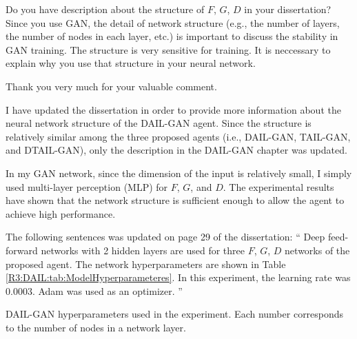 
\begin{revcomment}
  Do you have description about the structure of $F$, $G$, $D$ in your dissertation?
  Since you use GAN, the detail of network structure
  (e.g., the number of layers,
  the number of nodes in each layer, etc.)
  is important to discuss the stability in GAN training.
  The structure is very sensitive for training.
  It is neccessary to explain why you use that structure in your neural network.
\end{revcomment}

\begin{revresponse}
  Thank you very much for your valuable comment.

  I have updated the dissertation in order to provide more information about the neural network structure of the DAIL-GAN agent.
  Since the structure is relatively similar among the three proposed agents
  (i.e., DAIL-GAN, TAIL-GAN, and DTAIL-GAN),
  only the description in the DAIL-GAN chapter was updated.

  In my GAN network,
  since the dimension of the input is relatively small,
  I simply used multi-layer perception (MLP) for $F$, $G$, and $D$.
  The experimental results have shown that the network structure is sufficient enough to allow the agent to achieve high performance.

  \begin{correction}
    The following sentences was updated on page 29 of the dissertation:
    \enquote{%
      Deep feed-forward networks with 2 hidden layers are used for three $F$, $G$, $D$ networks of the proposed agent.
      The network hyperparameters are shown in Table \ref{R3:DAIL:tab:ModelHyperparameteres}.
      In this experiment, the learning rate was 0.0003.
      Adam was used as an optimizer.%
    }

    {DAIL-GAN hyperparameters used in the experiment. Each number corresponds to the number of nodes in a network layer.\label{R3:DAIL:tab:ModelHyperparameteres}}
  \end{correction}
\end{revresponse}

